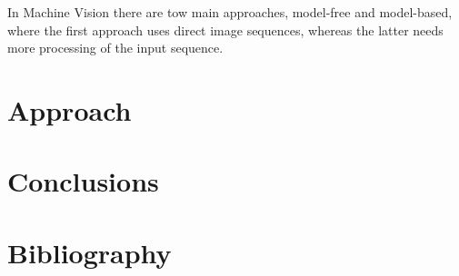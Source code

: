 \documentclass[12pt]{article}
\theoremstyle{definition}
\begin{document}
	In Machine Vision there are tow main approaches, model-free and model-based, where the first approach uses direct image sequences, whereas the latter needs more processing of the input sequence.
	
	
	
	\newpage
	
	\section{Approach}
	\vspace{1cm}
	
	\newpage
	
	\section{Conclusions}
	\vspace{1cm}
	
	\newpage
	
	\section{Bibliography}
	
	
	
\end{document}
